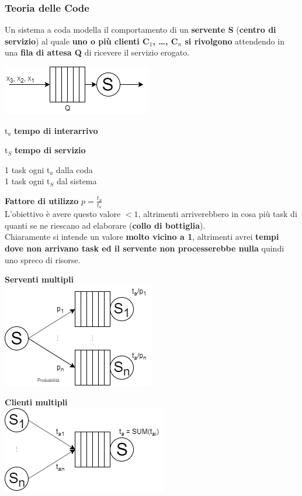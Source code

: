 \documentclass[10pt]{report}
\begin{document}
\subsubsection{Teoria delle Code}
Un sistema a coda modella il comportamento di un \textbf{servente S} (\textbf{centro di servizio}) al quale \textbf{uno o più clienti C$_1$, \ldots, C$_n$ si rivolgono} attendendo in una \textbf{fila di attesa Q} di ricevere il servizio erogato.
\begin{center}
\includegraphics[scale=1]{coda.png}
\end{center}
\begin{list}{}{}
	\item t$_a$ \textbf{tempo di interarrivo}
	\item t$_S$ \textbf{tempo di servizio}
	\item 1 task ogni t$_a$ dalla coda\\
	1 task ogni t$_S$ dal sistema
	\item \textbf{Fattore di utilizzo} $p = \frac{t_S}{t_a}$\\
	L'obiettivo è avere questo valore $< 1$, altrimenti arriverebbero in cosa più task di quanti se ne riescano ad elaborare (\textbf{collo di bottiglia}).\\
	Chiaramente si intende un valore \textbf{molto vicino a 1}, altrimenti avrei \textbf{tempi dove non arrivano task ed il servente non processerebbe nulla} quindi uno spreco di risorse.
\end{list}
\begin{multicols}{2}
\begin{center}
\textbf{Serventi multipli}\\
\includegraphics[scale=1]{servmult.png}
\end{center}
\begin{center}
\textbf{Clienti multipli}\\
\includegraphics[scale=1]{clientimulti.png}
\end{center}
\end{multicols}
\pagebreak
\end{document}
